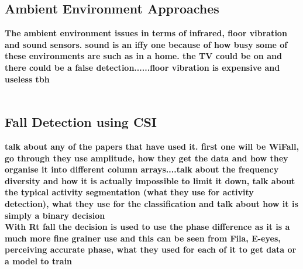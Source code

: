 \subsection{Ambient Environment Approaches} 
\textbf{The ambient environment issues in terms of infrared, floor vibration and sound sensors. sound is an iffy one because of how busy some of these environments are such as in a home. the TV could be on and there could be a false detection......floor vibration is expensive and useless tbh} \\\\




\subsection{Fall Detection using CSI}
\textbf{talk about any of the papers that have used it. first one will be WiFall, go through they use amplitude, how they get the data and how they organise it into different column arrays....talk about the frequency diversity and how it is actually impossible to limit it down, talk about the typical activity segmentation (what they use for activity detection), what they use for the classification and talk about how it is simply a binary decision \\ With Rt fall the decision is used to use the phase difference as it is a much more fine grainer use and this can be seen from Fila, E-eyes, perceiving accurate phase, what they used for each of it to get data or a model to train } \\\\





